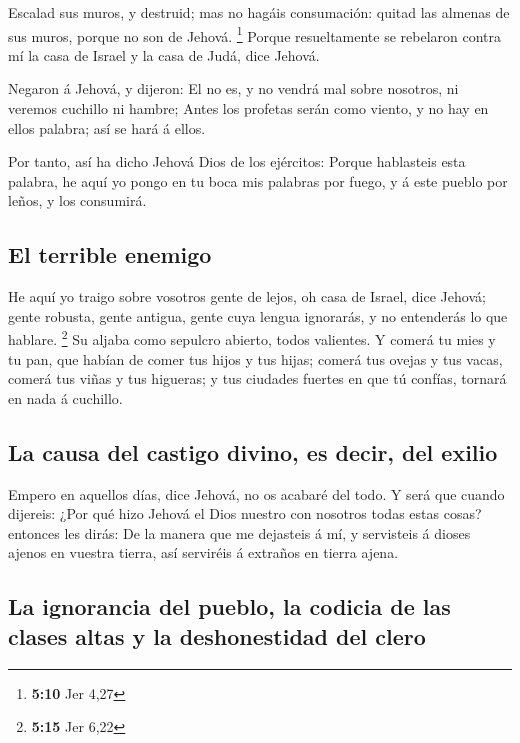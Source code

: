  Escalad sus muros, y destruid; mas no hagáis
consumación: quitad las almenas de sus muros, porque no son de Jehová.
\footnote{\textbf{5:10} Jer 4,27}  Porque resueltamente
se rebelaron contra mí la casa de Israel y la casa de Judá, dice Jehová.

 Negaron á Jehová, y dijeron: El no es, y no vendrá mal
sobre nosotros, ni veremos cuchillo ni hambre;  Antes los
profetas serán como viento, y no hay en ellos palabra; así se hará á
ellos.

 Por tanto, así ha dicho Jehová Dios de los ejércitos:
Porque hablasteis esta palabra, he aquí yo pongo en tu boca mis palabras
por fuego, y á este pueblo por leños, y los consumirá.

\hypertarget{el-terrible-enemigo}{%
\subsection{El terrible enemigo}\label{el-terrible-enemigo}}

 He aquí yo traigo sobre vosotros gente de lejos, oh casa
de Israel, dice Jehová; gente robusta, gente antigua, gente cuya lengua
ignorarás, y no entenderás lo que hablare. \footnote{\textbf{5:15} Jer
  6,22}  Su aljaba como sepulcro abierto, todos
valientes.  Y comerá tu mies y tu pan, que habían de
comer tus hijos y tus hijas; comerá tus ovejas y tus vacas, comerá tus
viñas y tus higueras; y tus ciudades fuertes en que tú confías, tornará
en nada á cuchillo.

\hypertarget{la-causa-del-castigo-divino-es-decir-del-exilio}{%
\subsection{La causa del castigo divino, es decir, del
exilio}\label{la-causa-del-castigo-divino-es-decir-del-exilio}}

 Empero en aquellos días, dice Jehová, no os acabaré del
todo.  Y será que cuando dijereis: ¿Por qué hizo Jehová
el Dios nuestro con nosotros todas estas cosas? entonces les dirás: De
la manera que me dejasteis á mí, y servisteis á dioses ajenos en vuestra
tierra, así serviréis á extraños en tierra ajena.

\hypertarget{la-ignorancia-del-pueblo-la-codicia-de-las-clases-altas-y-la-deshonestidad-del-clero}{%
\subsection{La ignorancia del pueblo, la codicia de las clases altas y
la deshonestidad del
clero}\label{la-ignorancia-del-pueblo-la-codicia-de-las-clases-altas-y-la-deshonestidad-del-clero}}

